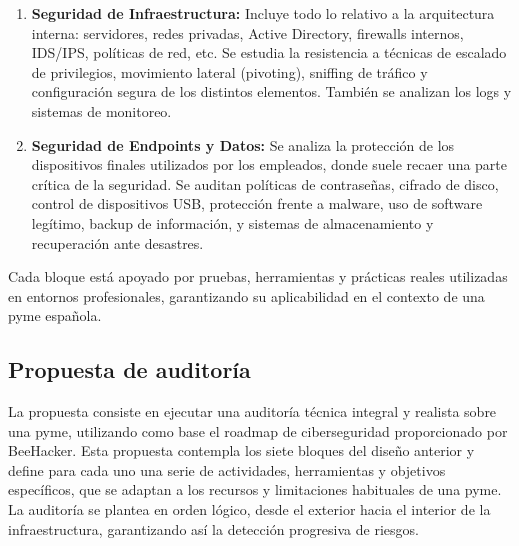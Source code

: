 \documentclass[a4paper, 10pt]{article}
\begin{document}
\begin{enumerate}
\item \textbf{Seguridad de Infraestructura:} Incluye todo lo relativo a la arquitectura interna: servidores, redes privadas, Active Directory, firewalls internos, IDS/IPS, políticas de red, etc. Se estudia la resistencia a técnicas de escalado de privilegios, movimiento lateral (pivoting), sniffing de tráfico y configuración segura de los distintos elementos. También se analizan los logs y sistemas de monitoreo.

\item \textbf{Seguridad de Endpoints y Datos:} Se analiza la protección de los dispositivos finales utilizados por los empleados, donde suele recaer una parte crítica de la seguridad. Se auditan políticas de contraseñas, cifrado de disco, control de dispositivos USB, protección frente a malware, uso de software legítimo, backup de información, y sistemas de almacenamiento y recuperación ante desastres.

\end{enumerate}

Cada bloque está apoyado por pruebas, herramientas y prácticas reales utilizadas en entornos profesionales, garantizando su aplicabilidad en el contexto de una pyme española.

\subsection{Propuesta de auditoría}

La propuesta consiste en ejecutar una auditoría técnica integral y realista sobre una pyme, utilizando como base el roadmap de ciberseguridad proporcionado por BeeHacker. Esta propuesta contempla los siete bloques del diseño anterior y define para cada uno una serie de actividades, herramientas y objetivos específicos, que se adaptan a los recursos y limitaciones habituales de una pyme. La auditoría se plantea en orden lógico, desde el exterior hacia el interior de la infraestructura, garantizando así la detección progresiva de riesgos.
\end{document}
